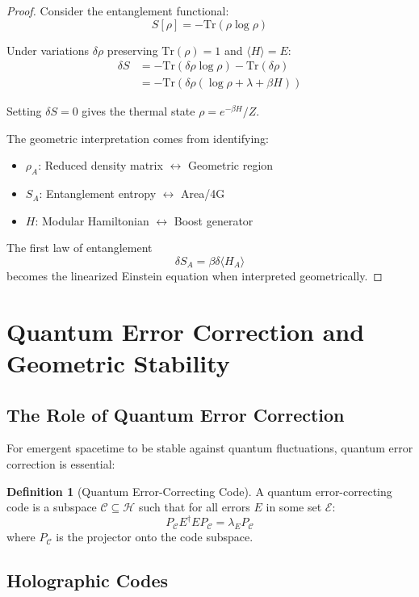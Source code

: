\documentclass[12pt,a4paper]{article}
\theoremstyle{plain}
\theoremstyle{definition}
\newtheorem{definition}[theorem]{Definition}
\theoremstyle{remark}
\begin{document}
\begin{proof}
Consider the entanglement functional:
\[S[\rho] = -\text{Tr}(\rho \log \rho)\]

Under variations $\delta \rho$ preserving $\text{Tr}(\rho) = 1$ and $\langle H \rangle = E$:
\begin{align}
\delta S &= -\text{Tr}(\delta\rho \log \rho) - \text{Tr}(\delta\rho) \\
&= -\text{Tr}(\delta\rho(\log \rho + \lambda + \beta H))
\end{align}

Setting $\delta S = 0$ gives the thermal state $\rho = e^{-\beta H}/Z$.

The geometric interpretation comes from identifying:
\begin{itemize}
\item $\rho_A$: Reduced density matrix $\leftrightarrow$ Geometric region
\item $S_A$: Entanglement entropy $\leftrightarrow$ Area/4G
\item $H$: Modular Hamiltonian $\leftrightarrow$ Boost generator
\end{itemize}

The first law of entanglement
\[\delta S_A = \beta \delta \langle H_A \rangle\]
becomes the linearized Einstein equation when interpreted geometrically.
\end{proof}

\section{Quantum Error Correction and Geometric Stability}

\subsection{The Role of Quantum Error Correction}

For emergent spacetime to be stable against quantum fluctuations, quantum error correction is essential:

\begin{definition}[Quantum Error-Correcting Code]
A quantum error-correcting code is a subspace $\mathcal{C} \subseteq \mathcal{H}$ such that for all errors $E$ in some set $\mathcal{E}$:
\[P_{\mathcal{C}} E^\dagger E P_{\mathcal{C}} = \lambda_E P_{\mathcal{C}}\]
where $P_{\mathcal{C}}$ is the projector onto the code subspace.
\end{definition}

\subsection{Holographic Codes}
\end{document}
